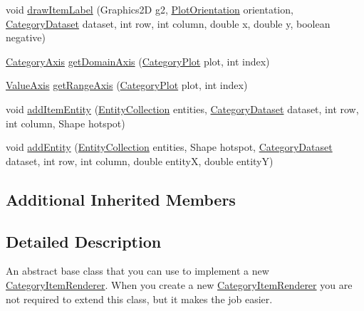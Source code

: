 \begin{DoxyCompactItemize}
\item 
void \mbox{\hyperlink{classorg_1_1jfree_1_1chart_1_1renderer_1_1category_1_1_abstract_category_item_renderer_a0d67a0cd5739297d2b31482f2fb7fa0f}{draw\+Item\+Label}} (Graphics2D g2, \mbox{\hyperlink{classorg_1_1jfree_1_1chart_1_1plot_1_1_plot_orientation}{Plot\+Orientation}} orientation, \mbox{\hyperlink{interfaceorg_1_1jfree_1_1data_1_1category_1_1_category_dataset}{Category\+Dataset}} dataset, int row, int column, double x, double y, boolean negative)
\item 
\mbox{\hyperlink{classorg_1_1jfree_1_1chart_1_1axis_1_1_category_axis}{Category\+Axis}} \mbox{\hyperlink{classorg_1_1jfree_1_1chart_1_1renderer_1_1category_1_1_abstract_category_item_renderer_af9a5e3fcc2c090ca3702fba7eec846c6}{get\+Domain\+Axis}} (\mbox{\hyperlink{classorg_1_1jfree_1_1chart_1_1plot_1_1_category_plot}{Category\+Plot}} plot, int index)
\item 
\mbox{\hyperlink{classorg_1_1jfree_1_1chart_1_1axis_1_1_value_axis}{Value\+Axis}} \mbox{\hyperlink{classorg_1_1jfree_1_1chart_1_1renderer_1_1category_1_1_abstract_category_item_renderer_a45c9a5cd74ecf357ba848d0cd9a99a3f}{get\+Range\+Axis}} (\mbox{\hyperlink{classorg_1_1jfree_1_1chart_1_1plot_1_1_category_plot}{Category\+Plot}} plot, int index)
\item 
void \mbox{\hyperlink{classorg_1_1jfree_1_1chart_1_1renderer_1_1category_1_1_abstract_category_item_renderer_a5020bb6be04ce8af7507d2f99b67f09c}{add\+Item\+Entity}} (\mbox{\hyperlink{interfaceorg_1_1jfree_1_1chart_1_1entity_1_1_entity_collection}{Entity\+Collection}} entities, \mbox{\hyperlink{interfaceorg_1_1jfree_1_1data_1_1category_1_1_category_dataset}{Category\+Dataset}} dataset, int row, int column, Shape hotspot)
\item 
void \mbox{\hyperlink{classorg_1_1jfree_1_1chart_1_1renderer_1_1category_1_1_abstract_category_item_renderer_a685346a0d46fbe50a1b1e6af94b75606}{add\+Entity}} (\mbox{\hyperlink{interfaceorg_1_1jfree_1_1chart_1_1entity_1_1_entity_collection}{Entity\+Collection}} entities, Shape hotspot, \mbox{\hyperlink{interfaceorg_1_1jfree_1_1data_1_1category_1_1_category_dataset}{Category\+Dataset}} dataset, int row, int column, double entityX, double entityY)
\end{DoxyCompactItemize}
\subsection*{Additional Inherited Members}


\subsection{Detailed Description}
An abstract base class that you can use to implement a new \mbox{\hyperlink{interfaceorg_1_1jfree_1_1chart_1_1renderer_1_1category_1_1_category_item_renderer}{Category\+Item\+Renderer}}. When you create a new \mbox{\hyperlink{interfaceorg_1_1jfree_1_1chart_1_1renderer_1_1category_1_1_category_item_renderer}{Category\+Item\+Renderer}} you are not required to extend this class, but it makes the job easier. 

